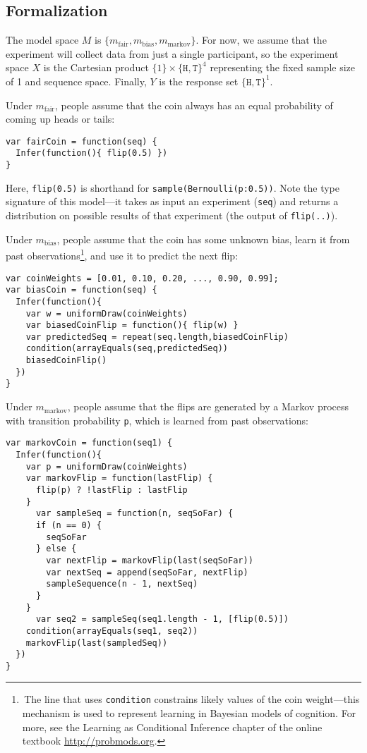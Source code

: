 \documentclass[10pt,letterpaper]{article}
\begin{document}
\subsection{Formalization}

The model space $M$ is $\{m_{\text{fair}}, m_{\text{bias}}, m_{\text{markov}}\}$.
For now, we assume that the experiment will collect data from just a single participant, so the experiment space $X$ is the Cartesian product $\{1\} \times \{\texttt{H}, \texttt{T}\}^4$ representing the fixed sample size of 1 and sequence space.
Finally, $Y$ is the response set $\{\texttt{H}, \texttt{T}\}^1$.

Under $m_{\text{fair}}$, people assume that the coin always has an equal probability of coming up heads or tails:
\begin{lstlisting}[upquote=true]
var fairCoin = function(seq) {
  Infer(function(){ flip(0.5) })
}
\end{lstlisting}
Here, \texttt{flip(0.5)} is shorthand for \texttt{sample(Bernoulli({p:0.5}))}.
Note the type signature of this model---it takes as input an experiment (\texttt{seq}) and returns a distribution on possible results of that experiment (the output of \texttt{flip(..)}).

Under $m_{\text{bias}}$, people assume that the coin has some unknown bias, learn it from past observations\footnote{\,The line that uses \texttt{condition} constrains likely values of the coin weight---this mechanism is used to represent learning in Bayesian models of cognition. For more, see the Learning as Conditional Inference chapter of the online textbook \url{http://probmods.org}.}, and use it to predict the next flip:
\begin{lstlisting}[upquote=true]
var coinWeights = [0.01, 0.10, 0.20, ..., 0.90, 0.99];
var biasCoin = function(seq) {
  Infer(function(){
    var w = uniformDraw(coinWeights)
    var biasedCoinFlip = function(){ flip(w) }
    var predictedSeq = repeat(seq.length,biasedCoinFlip)
    condition(arrayEquals(seq,predictedSeq))
    biasedCoinFlip()
  })
}
\end{lstlisting}
Under $m_{\text{markov}}$, people assume that the flips are generated by a Markov process with transition probability \texttt{p}, which is learned from past observations:

\begin{lstlisting}
var markovCoin = function(seq1) {
  Infer(function(){
    var p = uniformDraw(coinWeights)
    var markovFlip = function(lastFlip) {
      flip(p) ? !lastFlip : lastFlip
    }
	  var sampleSeq = function(n, seqSoFar) {
      if (n == 0) {
        seqSoFar
      } else {
        var nextFlip = markovFlip(last(seqSoFar))
        var nextSeq = append(seqSoFar, nextFlip)
        sampleSequence(n - 1, nextSeq)
      }
    }
	  var seq2 = sampleSeq(seq1.length - 1, [flip(0.5)])
    condition(arrayEquals(seq1, seq2))
    markovFlip(last(sampledSeq))
  })
}
\end{lstlisting}
\end{document}
